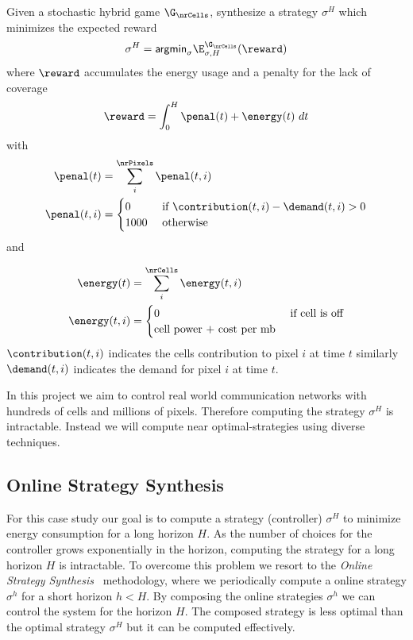 \begin{definition}
  \label{def:optimal}
  Given a stochastic hybrid game $\G_{\nrCells}$, synthesize a
  strategy $\sigma^H$ which minimizes the expected reward 
  \[
     \sigma^H = 
     \mbox{{\sf argmin}}_{\sigma}\E^{\G_{\nrCells}}_{\sigma,H}(\reward) 
   \]
   where $\reward$ accumulates the energy usage and a penalty for the
   lack of coverage 
    \[
    \reward = \int_0^H
    \penal(t) + \energy(t) \ dt
  \]
  with 
  \begin{align*}
      \penal(t) & = \sum^{\nrPixels}_i \penal(t,i)
      \\
      \penal(t,i)& =
      \begin{cases}
        0 & \text{ if } \contribution(t,i) - \demand(t,i) > 0 
      \\
        1000 & \text{ otherwise }
      \end{cases}
  \end{align*}
  and
  
    \begin{align*}
      \energy(t) &= \sum^{\nrCells}_i \energy(t,i) \\
      \energy(t,i) &=
                     \begin{cases}
                       0 & \text{ if cell is off}
                       \\
                       \text{cell power + cost per mb}
                     \end{cases}
    \end{align*}
    $\contribution(t,i)$ indicates the cells contribution to pixel $i$
    at time $t$ similarly $\demand(t,i)$ indicates the demand for
    pixel $i$ at time $t$.
\end{definition}


In this project we aim to control real world communication networks
with hundreds of cells and millions of pixels. Therefore computing the
strategy $\sigma^H$ is intractable. Instead we will compute near
optimal-strategies using diverse techniques.




\subsection{Online Strategy Synthesis}%
\label{onlineStrategySynthesis}
For this case study our goal is to compute a strategy (controller)
$\sigma^H$ to minimize energy consumption for a long horizon $H$. As
the number of choices for the controller grows exponentially in the
horizon, computing the strategy for a long horizon $H$ is
intractable. To overcome this problem we resort to the \emph{Online
  Strategy Synthesis}~\cite{DBLP:conf/tacas/LarsenMMST16} methodology,
where we periodically compute a online strategy $\sigma^h$ for a short
horizon $h < H$. By composing the online strategies $\sigma^h$ we can
control the system for the horizon $H$.  The composed strategy is
less optimal than the optimal strategy $\sigma^H$ but it can be
computed effectively.

